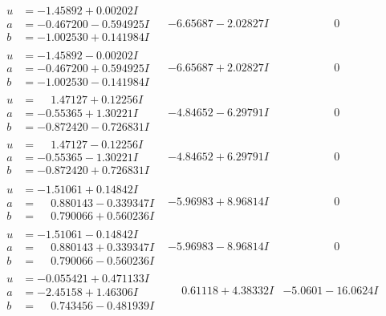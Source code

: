 \documentclass[1p]{elsarticle_modified}
\theoremstyle{definition}
\begin{document}
$$\begin{array}{c|c|c}
\begin{aligned}
u &= -1.45892 + 0.00202 I \\
a &= -0.467200 - 0.594925 I \\
b &= -1.002530 + 0.141984 I\end{aligned}
 & -6.65687 - 2.02827 I & \phantom{-0.000000 } 0 \\ \hline\begin{aligned}
u &= -1.45892 - 0.00202 I \\
a &= -0.467200 + 0.594925 I \\
b &= -1.002530 - 0.141984 I\end{aligned}
 & -6.65687 + 2.02827 I & \phantom{-0.000000 } 0 \\ \hline\begin{aligned}
u &= \phantom{-}1.47127 + 0.12256 I \\
a &= -0.55365 + 1.30221 I \\
b &= -0.872420 - 0.726831 I\end{aligned}
 & -4.84652 - 6.29791 I & \phantom{-0.000000 } 0 \\ \hline\begin{aligned}
u &= \phantom{-}1.47127 - 0.12256 I \\
a &= -0.55365 - 1.30221 I \\
b &= -0.872420 + 0.726831 I\end{aligned}
 & -4.84652 + 6.29791 I & \phantom{-0.000000 } 0 \\ \hline\begin{aligned}
u &= -1.51061 + 0.14842 I \\
a &= \phantom{-}0.880143 - 0.339347 I \\
b &= \phantom{-}0.790066 + 0.560236 I\end{aligned}
 & -5.96983 + 8.96814 I & \phantom{-0.000000 } 0 \\ \hline\begin{aligned}
u &= -1.51061 - 0.14842 I \\
a &= \phantom{-}0.880143 + 0.339347 I \\
b &= \phantom{-}0.790066 - 0.560236 I\end{aligned}
 & -5.96983 - 8.96814 I & \phantom{-0.000000 } 0 \\ \hline\begin{aligned}
u &= -0.055421 + 0.471133 I \\
a &= -2.45158 + 1.46306 I \\
b &= \phantom{-}0.743456 - 0.481939 I\end{aligned}
 & \phantom{-}0.61118 + 4.38332 I & -5.0601 - 16.0624 I \\ \hline\begin{aligned}

\end{aligned}
\end{array}$$
\end{document}
